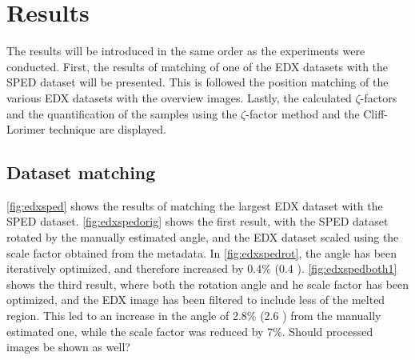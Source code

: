 \chapter{Results}

The results will be introduced in the same order as the experiments were conducted. First, the results of matching of one of the EDX datasets with the SPED dataset will be presented. This is followed the position matching of the various EDX datasets with the overview images. Lastly, the calculated $\zeta$-factors and the quantification of the samples using the $\zeta$-factor method and the Cliff-Lorimer technique are displayed.

\section{Dataset matching}

\cref{fig:edxsped} shows the results of matching the largest EDX dataset with the SPED dataset. \cref{fig:edxspedorig} shows the first result, with the SPED dataset rotated by the manually estimated angle, and the EDX dataset scaled using the scale factor obtained from the metadata. In \cref{fig:edxspedrot}, the angle has been iteratively optimized, and therefore increased by 0.4\% (0.4 \deg). \cref{fig:edxspedboth1} shows the third result, where both the rotation angle and he scale factor has been optimized, and the EDX image has been filtered to include less of the melted region. This led to an increase in the angle of 2.8\% (2.6 \deg) from the manually estimated one, while the scale factor was reduced by 7\%. Should processed images be shown as well? %




